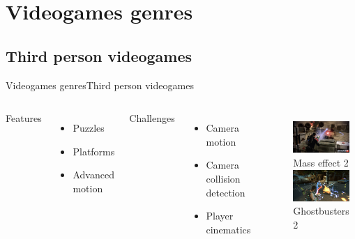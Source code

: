 \documentclass[10pt,compress]{beamer} %
\begin{document}
\section{Videogames genres}
\subsection[Third person videogames]{Third person videogames}
\begin{frame}{Videogames genres}{Third person videogames}
	\vspace{-0.3cm}
    \begin{columns}
		Features
			\begin{itemize}
			\item Puzzles
			\item Platforms
			\item Advanced motion
			\end{itemize}
	 	Challenges
			\begin{itemize}
			\item Camera motion
			\item Camera collision detection
			\item Player cinematics
			\end{itemize}

   	 	\begin{figure}[t]
		\begin{center}
		    \includegraphics[width=0.9\linewidth]{figs/mass2}\\Mass effect 2\\\bigskip
		    \includegraphics[width=0.9\linewidth]{figs/ghostbuster2}\\Ghostbusters 2\\
		\end{center}
   	 	\end{figure}
    \end{columns}
\end{frame}
\end{document}

